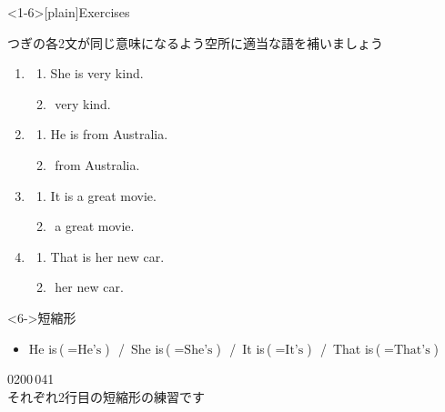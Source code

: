 \documentclass[aspectratio=169,xcolor={dvipsnames,table}]{beamer}
\begin{document}
\begin{frame}<1-6>[plain]{Exercises}

 {\small つぎの各2文が同じ意味になるよう空所に適当な語を補いましょう}

\begin{enumerate}
 \item \begin{enumerate}
	\item She is very kind.
	\item {}\,\,very kind.
       \end{enumerate}
 \item \begin{enumerate}
	\item He is from Australia.\hfill{}\,\,
	\item {}\,\,from Australia.
       \end{enumerate}
 \item \begin{enumerate}
	\item It is a great movie.\hfill{}
	\item {}\,\,a great movie.
       \end{enumerate}
 \item \begin{enumerate}
	\item That is her new car.\hfill\scalebox{2}{\faCar}
	\item {}\,\,her new car.
       \end{enumerate}
\end{enumerate}

\begin{block}<6->{短縮形}
\begin{itemize}[square]
 \item He is\,($=\text{He's}$)\,\,\,\,/\,\,\,She is\,($=\text{She's}$)\,\,\,\,/\,\,\,It is\,($=\text{It's}$)\,\,\,\,/\,\,\,That is\,($=\text{That's}$)
\end{itemize}  
     \end{block}

\vspace*{-5pt}

\hfill{\tiny 0200}\,{\tiny {}041}\\
\hfill{\scriptsize それぞれ2行目の短縮形の練習です}

\end{frame}
\end{document}

